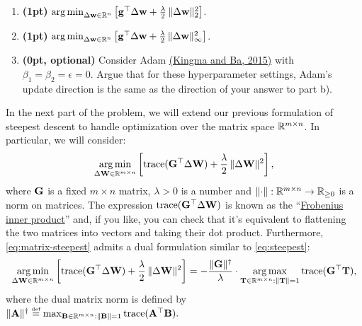 \documentclass[12pt,letterpaper]{article}
\begin{document}
\begin{enumerate}
    \begin{enumerate}
\item \textbf{(1pt)} $\operatorname*{arg\,min}_{\Delta {\mathbf{w}} \in \mathbb{R}^n} \left[{\mathbf{g}}^\top \Delta {\mathbf{w}} + \frac{\lambda}{2} \, \Vert {\Delta {\mathbf{w}}} \Vert_2^2 \right]$.

\item \textbf{(1pt)} $\operatorname*{arg\,min}_{\Delta {\mathbf{w}} \in \mathbb{R}^n} \left[{\mathbf{g}}^\top \Delta {\mathbf{w}} + \frac{\lambda}{2} \, \Vert {\Delta {\mathbf{w}}} \Vert_\infty^2 \right]$.
\end{enumerate}


\begin{enumerate}
\setcounter{enumii}{2}
\item \textbf{(0pt, optional)} Consider Adam \href{https://arxiv.org/abs/1412.6980}{(Kingma and Ba, 2015)} with $\beta_1 = \beta_2 = \epsilon = 0$. Argue that for these hyperparameter settings, Adam's update direction is the same as the direction of your answer to part b).
\end{enumerate}    
    
\end{enumerate}

In the next part of the problem, we will extend our previous formulation of steepest descent to handle optimization over the matrix space $\mathbb{R}^{m\times n}$. In particular, we will consider:
\begin{align}\label{eq:matrix-steepest}
    \operatorname*{arg\,min}_{\Delta {\mathbf{W}} \in \mathbb{R}^{m \times n}} \left[\operatorname{trace}({\mathbf{G}}^\top \Delta {\mathbf{W}}) + \frac{\lambda}{2} \, \Vert {\Delta {\mathbf{W}}} \Vert^2 \right],
\end{align}
where ${\mathbf{G}}$ is a fixed $m \times n$ matrix, $\lambda >0$ is a number and $\Vert {\cdot} \Vert:\mathbb{R}^{m\times n}\to \mathbb{R}_{\geq0}$ is a norm on matrices. The expression $\operatorname{trace}({\mathbf{G}}^\top \Delta {\mathbf{W}})$ is known as the ``\href{https://en.wikipedia.org/wiki/Frobenius_inner_product}{Frobenius inner product}'' and, if you like, you can check that it's equivalent to flattening the two matrices into vectors and taking their dot product. Furthermore, \cref{eq:matrix-steepest} admits a dual formulation similar to \cref{eq:steepest}:
\begin{align}\label{eq:dual-matrix-steepest}
    \operatorname*{arg\,min}_{\Delta {\mathbf{W}} \in \mathbb{R}^{m \times n}} \left[\operatorname{trace}({\mathbf{G}}^\top \Delta {\mathbf{W}}) + \frac{\lambda}{2} \, \Vert {\Delta {\mathbf{W}}} \Vert^2 \right] = - \frac{\Vert {{\mathbf{G}}} \Vert^\dagger}{\lambda} \cdot \operatorname*{arg\,max}_{{\mathbf{T}} \in \mathbb{R}^{m\times n}:\Vert {{\mathbf{T}}} \Vert=1} \operatorname{trace}({\mathbf{G}}^\top {\mathbf{T}}),
\end{align}
where the dual matrix norm is defined by $\Vert {{\mathbf{A}}} \Vert^\dagger \overset{\mbox{\normalfont\tiny def}}{=} \max_{{\mathbf{B}} \in \mathbb{R}^{m \times n} : \Vert {{\mathbf{B}}} \Vert = 1} \operatorname{trace}({\mathbf{A}}^\top {\mathbf{B}}).$
\end{document}
